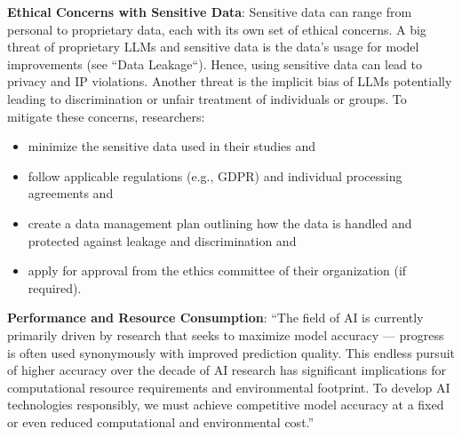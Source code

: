 \textbf{Ethical Concerns with Sensitive Data}:
Sensitive data can range from personal to proprietary data, each with its own set of ethical concerns. A big threat of proprietary LLMs and sensitive data is the data's usage for model improvements (see ``Data Leakage``). Hence, using sensitive data can lead to privacy and IP violations.
Another threat is the implicit bias of LLMs potentially leading to discrimination or unfair treatment of individuals or groups.
To mitigate these concerns, researchers:
\begin{itemize}
  \item \should minimize the sensitive data used in their studies and
  \item \must follow applicable regulations (e.g., GDPR) and individual processing agreements and
  \item \should create a data management plan outlining how the data is handled and protected against leakage and discrimination and
  \item \should apply for approval from the ethics committee of their organization (if required).
\end{itemize}

\textbf{Performance and Resource Consumption}:
\enquote{The field of AI is currently primarily driven by research that seeks to maximize model accuracy — progress is often used synonymously with improved prediction quality. This endless pursuit of higher accuracy over the decade of AI research has significant implications for computational resource requirements and environmental footprint. To develop AI technologies responsibly, we must achieve competitive model accuracy at a fixed or even reduced computational and environmental cost.}~\cite{DBLP:conf/mlsys/WuRGAAMCBHBGGOM22}


